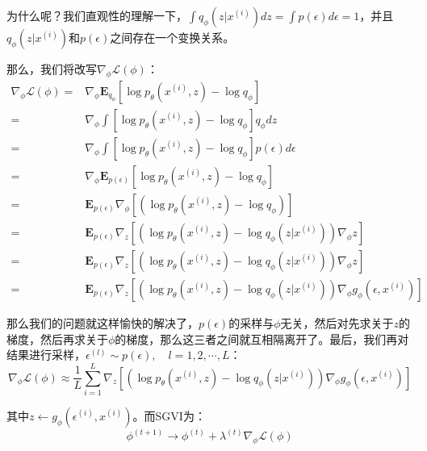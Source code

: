 \documentclass[a4paper]{article}
\begin{document}
为什么呢？我们直观性的理解一下，$\int q_{\phi}(z|x^{(i)})dz = 
\int p(\epsilon)d\epsilon = 1$，并且$q_{\phi}(z|x^{(i)})$和$p(\epsilon)$之间存在一个变换关系。

那么，我们将改写$\nabla_{\phi} \mathcal{L}(\phi)$：
\begin{equation}
    \begin{split}
        \nabla_{\phi} \mathcal{L}(\phi) 
        = & \nabla_{\phi} \mathbf{E}_{q_{\phi}}\left[ \log p_{\theta}(x^{(i)},z) - \log q_{\phi} \right] \\
        = & \nabla_{\phi} \int \left[ \log p_{\theta}(x^{(i)},z) - \log q_{\phi} \right]q_{\phi} dz \\
        = & \nabla_{\phi} \int \left[ \log p_{\theta}(x^{(i)},z) - \log q_{\phi} \right]p(\epsilon) d\epsilon \\
         = & \nabla_{\phi} \mathbf{E}_{p(\epsilon)}\left[ \log p_{\theta}(x^{(i)},z) - \log q_{\phi} \right] \\
         = & \mathbf{E}_{p(\epsilon)} \nabla_{\phi} \left[( \log p_{\theta}(x^{(i)},z) - \log q_{\phi}) \right] \\
         = & \mathbf{E}_{p(\epsilon)}\nabla_{z}\left[( \log p_{\theta}(x^{(i)},z) - \log q_{\phi}(z|x^{(i)}))\nabla_{\phi}z \right] \\
         = & \mathbf{E}_{p(\epsilon)}\nabla_{z}\left[( \log p_{\theta}(x^{(i)},z) - \log q_{\phi}(z|x^{(i)}))\nabla_{\phi}z \right] \\
         = & \mathbf{E}_{p(\epsilon)}\nabla_{z}\left[( \log p_{\theta}(x^{(i)},z) - \log q_{\phi}(z|x^{(i)}))\nabla_{\phi}g_{\phi}(\epsilon, x^{(i)}) \right]
    \end{split}
\end{equation}

那么我们的问题就这样愉快的解决了，$p(\epsilon)$的采样与$\phi$无关，然后对先求关于$z$的梯度，然后再求关于$\phi$的梯度，那么这三者之间就互相隔离开了。最后，我们再对结果进行采样，$\epsilon^{(l)} \sim p(\epsilon), \quad l = 1, 2, \cdots, L$：
\begin{equation}
    \nabla_{\phi} \mathcal{L}(\phi) \approx \frac{1}{L} \sum_{i=1}^L
    \nabla_{z} \left[ (\log p_{\theta}(x^{(i)},z) - \log q_{\phi}(z|x^{(i)}))\nabla_{\phi}g_{\phi}(\epsilon, x^{(i)}) \right]
\end{equation}

其中$z \longleftarrow g_{\phi}(\epsilon^{(i)},x^{(i)})$。而SGVI为：
\begin{equation}
    \phi^{(t+1)} \longrightarrow \phi^{(t)} + \lambda^{(t)}\nabla_{\phi} \mathcal{L}(\phi)
\end{equation}
\end{document}

